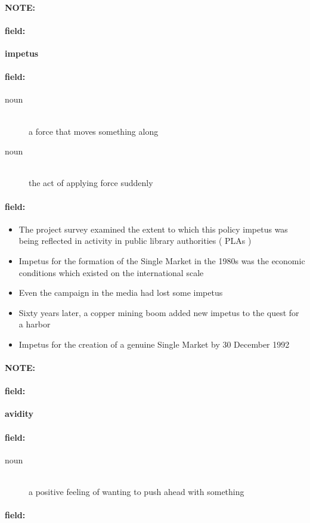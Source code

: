 \documentclass[12pt]{article}
\newenvironment{note}{\paragraph{NOTE:}}{}
\newenvironment{field}{\paragraph{field:}}{}
\begin{document}
\begin{note}
\begin{field}
\textbf{\large impetus}
\end{field}


\begin{field}
\begin{description}
\item[noun] \hfill \\ 
a force that moves something along

\item[noun] \hfill \\ 
the act of applying force suddenly

\end{description}
\end{field}

\begin{field}
\begin{itemize}
\item The project survey examined the extent to which this policy impetus was being reflected in activity in public library authorities ( PLAs )
\item Impetus for the formation of the Single Market in the 1980s was the economic conditions which existed on the international scale
\item Even the campaign in the media had lost some impetus
\item Sixty years later, a copper mining boom added new impetus to the quest for a harbor
\item Impetus for the creation of a genuine Single Market by 30 December 1992
\end{itemize}
\end{field}
\end{note}
\begin{note}
\begin{field}
\textbf{\large avidity}
\end{field}


\begin{field}
\begin{description}
\item[noun] \hfill \\ 
a positive feeling of wanting to push ahead with something

\end{description}
\end{field}

\begin{field}
\end{field}
\end{note}
\end{document}
